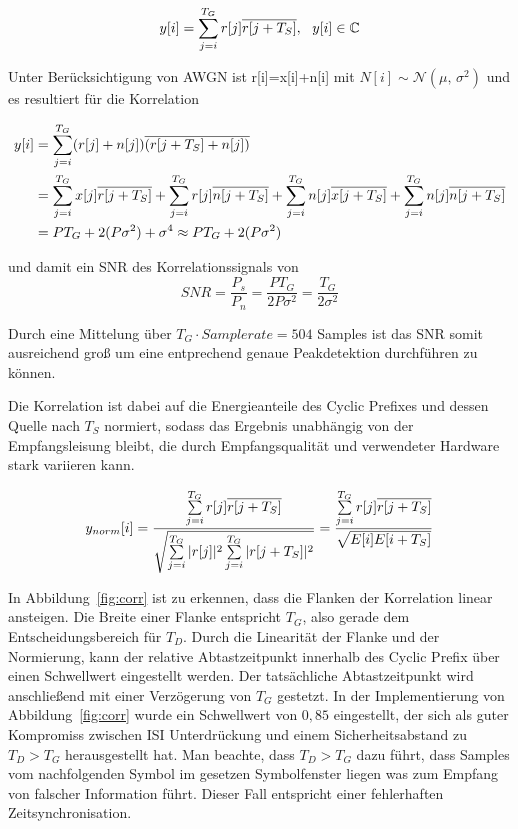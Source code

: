 \begin{equation}
y[i] = \sum \limits_{j=i}^{T_G}r[j] \overline{r[j+T_S]}, \ \ y[i] \in \mathbb{C}
\label{eq:corr_einfach}
\end{equation}

Unter Berücksichtigung von AWGN ist r[i]=x[i]+n[i] mit $N[i] \sim \mathcal{N}(\mu,\,\sigma^{2})$ und es resultiert für die Korrelation

\begin{equation}
    \begin{aligned}
y[i] &= \sum \limits_{j=i}^{T_G}(r[j]+n[j]) \overline{(r[j+T_S]+n[j])} \\
&= \sum \limits_{j=i}^{T_G}x[j] \overline{r[j+T_S]} + \sum \limits_{j=i}^{T_G}r[j] \overline{n[j+T_S]} + \sum \limits_{j=i}^{T_G}n[j] \overline{x[j+T_S]} + \sum \limits_{j=i}^{T_G}n[j] \overline{n[j+T_S]} \\
&= P T_G + 2(P \sigma^2) + \sigma^4 \approx P T_G + 2(P \sigma^2)
    \end{aligned}
\end{equation}

und damit ein SNR des Korrelationssignals von
\begin{equation}
SNR = \frac{P_s}{P_n} = \frac{P T_G}{2 P \sigma^2} = \frac{T_G}{2 \sigma^2}
\end{equation}

Durch eine Mittelung über $T_G \cdot Samplerate = 504$ Samples ist das SNR somit ausreichend groß um eine entprechend genaue Peakdetektion durchführen zu können.

Die Korrelation ist dabei auf die Energieanteile des Cyclic Prefixes und dessen Quelle nach $T_S$ normiert, sodass das Ergebnis unabhängig von der Empfangsleisung bleibt, die durch Empfangsqualität und verwendeter Hardware stark variieren kann.

\begin{equation}
    y_{norm}[i] = \frac{\sum \limits_{j=i}^{T_G}r[j] \overline{r[j+T_S]}}{\sqrt{\sum \limits_{j=i}^{T_G}|r[j]|^2 \sum \limits_{j=i}^{T_G}|r[j+T_S]|^2}} = \frac{\sum \limits_{j=i}^{T_G}r[j]     \overline{r[j+T_S]}}{\sqrt{E[i]E[i+T_S]}}
    \label{eq:norm_corr}
\end{equation}

In Abbildung~\ref{fig:corr} ist zu erkennen, dass die Flanken der Korrelation linear ansteigen. Die Breite einer Flanke entspricht $T_G$, also gerade dem Entscheidungsbereich für $T_D$. Durch die Linearität der Flanke und der Normierung, kann der relative Abtastzeitpunkt innerhalb des Cyclic Prefix über einen Schwellwert eingestellt werden. Der tatsächliche Abtastzeitpunkt wird anschließend mit einer Verzögerung von $T_G$ gestetzt. In der Implementierung von Abbildung~\ref{fig:corr} wurde ein Schwellwert von $0,85$ eingestellt, der sich als guter Kompromiss zwischen \ac{ISI} Unterdrückung und einem Sicherheitsabstand zu $T_D > T_G$ herausgestellt hat. Man beachte, dass $T_D > T_G$ dazu führt, dass Samples vom nachfolgenden Symbol im gesetzen Symbolfenster liegen was zum Empfang von falscher Information führt. Dieser Fall entspricht einer fehlerhaften Zeitsynchronisation.

